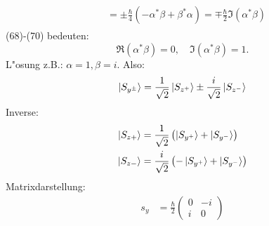 \documentclass[a4paper]{scrartcl}
\begin{document}
{\begin{aaufz}
\begin{align}
\begin{split}
& = \pm \frac \hbar 4 (- \alpha^* \beta + \beta^* \alpha) = \mp \frac \hbar 2 \Im(\alpha^* \beta)
\end{split}
\end{align}
(68)-(70) bedeuten:
$$\Re(\alpha^* \beta) = 0, \quad \Im(\alpha^* \beta) = 1.$$
L"osung z.B.: $\alpha = 1, \beta = i$. Also:
\begin{align}
\ket{ S_{y^\pm}} = \frac1{\sqrt2} \ket{ S_{z^+} } \pm \frac i{\sqrt2} \ket{ S_{z^-}}
\end{align}
Inverse:
\begin{align}
\begin{split}
\ket{ S_{z+}} & = \frac1{\sqrt2} \left( \ket{S_{y^+}} + \ket{ S_{y^-}} \right) \\
\ket{ S_{z-}} & = \frac i{\sqrt2} \left( - \ket{S_{y^+}} + \ket{ S_{y^-}} \right) \\
\end{split}
\end{align}
Matrixdarstellung:
\begin{align}
s_y & = \frac \hbar 2 \begin{pmatrix} 0 & -i \\ i & 0 \end{pmatrix}
\end{align}
\end{aaufz}
}
\end{document}

